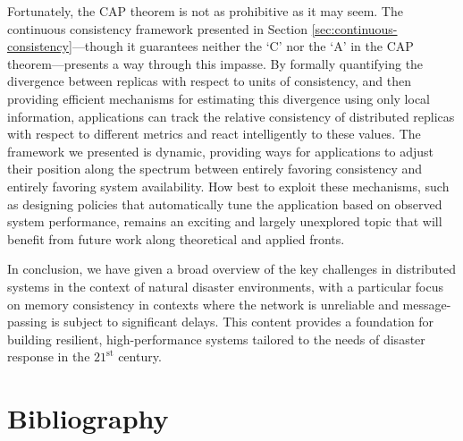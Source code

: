 \documentclass[]             %
{NASA}                       %
\theoremstyle{definition}
\begin{document}
Fortunately, the CAP theorem is not as prohibitive as it may seem. The
continuous consistency framework presented in Section
\ref{sec:continuous-consistency}---though it guarantees neither the
`C' nor the `A' in the CAP theorem---presents a way through this
impasse. By formally quantifying the divergence between replicas with
respect to units of consistency, and then providing efficient
mechanisms for estimating this divergence using only local
information, applications can track the relative consistency of
distributed replicas with respect to different metrics and react
intelligently to these values. The framework we presented is dynamic,
providing ways for applications to adjust their position along the
spectrum between entirely favoring consistency and entirely favoring
system availability. How best to exploit these mechanisms, such as
designing policies that automatically tune the application based on
observed system performance, remains an exciting and largely
unexplored topic that will benefit from future work along theoretical
and applied fronts.

In conclusion, we have given a broad overview of the key challenges in
distributed systems in the context of natural disaster environments,
with a particular focus on memory consistency in contexts where the
network is unreliable and message-passing is subject to significant
delays. This content provides a foundation for building resilient,
high-performance systems tailored to the needs of disaster response in
the $21^\textrm{st}$ century.

\section*{Bibliography}\label{bibliography}



\end{document}
